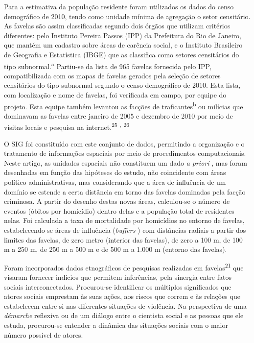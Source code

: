 \documentclass{article}
\begin{document}
Para a estimativa da população residente foram utilizados os dados do censo
demográfico de 2010, tendo como unidade mínima de agregação o setor censitário.
As favelas são assim classificadas segundo dois órgãos que utilizam critérios
diferentes: pelo Instituto Pereira Passos (IPP) da Prefeitura do Rio de Janeiro,
que mantém um cadastro sobre áreas de carência social, e o Instituto Brasileiro
de Geografia e Estatística (IBGE) que as classifica como setores censitários do
tipo subnormal.\textsuperscript{a}
Partiu-se da lista de 965 favelas fornecida pelo IPP, compatibilizada com os
mapas de favelas gerados pela seleção de setores censitários do tipo subnormal
segundo o censo demográfico de 2010. Esta lista, com localização e nome de
favelas, foi verificada em campo, por equipe do projeto. Esta equipe também
levantou as facções de traficantes\textsuperscript{b}
ou milícias que dominavam as favelas entre janeiro de 2005 e dezembro de 2010
por meio de visitas locais e pesquisa na internet.\textsuperscript{25}
\textsuperscript{,}
\textsuperscript{26}

O SIG foi constituído com este conjunto de dados, permitindo a organização e o
tratamento de informações espaciais por meio de procedimentos computacionais.
Neste artigo, as unidades espaciais não constituem um dado \textit{a priori}
, mas foram desenhadas em função das hipóteses do estudo, não coincidente com
áreas político-administrativas, mas considerando que a área de influência de um
domínio se estende a certa distância em torno das favelas dominadas pela facção
criminosa. A partir do desenho destas novas áreas, calculou-se o número de
eventos (óbitos por homicídio) dentro delas e a população total de residentes
nelas. Foi calculada a taxa de mortalidade por homicídios no entorno de favelas,
estabelecendo-se áreas de influência (\textit{buffers}
) com distâncias radiais a partir dos limites das favelas, de zero metro
(interior das favelas), de zero a 100 m, de 100 m a 250 m, de 250 m a 500 m e de
500 m a 1.000 m (entorno das favelas).

Foram incorporados dados etnográficos de pesquisas realizadas em
favelas\textsuperscript{21}
que visaram fornecer indícios que permitem inferências, pela sinergia entre
fatos sociais interconectados. Procurou-se identificar os múltiplos significados
que atores sociais emprestam às suas ações, aos riscos que correm e às relações
que estabelecem entre si nas diferentes situações de violência. Na perspectiva
de uma \textit{démarche}
reflexiva ou de um diálogo entre o cientista social e as pessoas que ele estuda,
procurou-se entender a dinâmica das situações sociais com o maior número
possível de atores.
\end{document}
